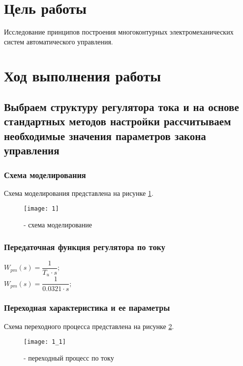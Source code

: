 







\section{Цель работы}
Исследование принципов построения многоконтурных электромеханических систем автоматического управления.

\section{Ход выполнения работы}

\subsection{Выбраем структуру регулятора тока и на основе стандартных методов настройки рассчитываем необходимые значения параметров закона управления}

\subsubsection{Схема моделирования}
Схема моделирования представлена на рисунке \ref{pic:pic_1}.
\begin{figure}[H]
	\begin{center}
		\texttt{[image: 1]}
		\caption{- схема моделирование} 
		\label{pic:pic_1} %
	\end{center}
\end{figure}

\subsubsection{Передаточная функция регулятора по току}
\begin{center}
	$W_{pm}(s)=\dfrac{1}{T_u\cdot s};$\\
	$W_{pm}(s)=\dfrac{1}{0.0321\cdot s};$\\
\end{center}

\newpage

\subsubsection{Переходная характеристика и ее параметры}
Схема переходного процесса представлена на рисунке \ref{pic:pic_2}.
\begin{figure}[H]
	\begin{center}
		\texttt{[image: 1\_1]}
		\caption{- переходный процесс по току} 
		\label{pic:pic_2} %
	\end{center}
\end{figure}

